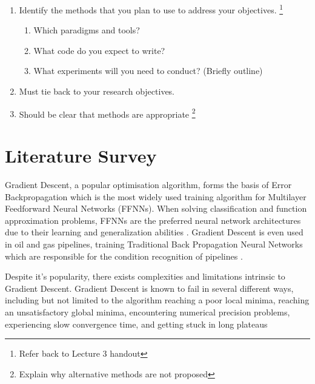\documentclass[runningheads,a4paper]{llncs}
\begin{document}
\begin{enumerate}
 \item Identify the methods that you plan to use to address your objectives. \footnote{Refer back to Lecture 3 handout}
 \begin{enumerate}
  \item Which paradigms and tools?
  \item What code do you expect to write?
  \item What experiments will you need to conduct? (Briefly outline)
 \end{enumerate}
 \item Must tie back to your research objectives.
 \item Should be clear that methods are appropriate \footnote{Explain why alternative methods are not proposed}

\end{enumerate}


\section{Literature Survey}

Gradient Descent, a popular optimisation algorithm, forms the basis of Error Backpropagation which is 
the most widely used training algorithm for Multilayer Feedforward Neural Networks (FFNNs). 
When solving classification and function approximation problems, FFNNs are the preferred neural network architectures 
due to their learning and generalization abilities \cite{gong2012training}. Gradient Descent is even used in oil and gas pipelines, 
training Traditional Back Propagation Neural Networks which are responsible for the condition recognition of pipelines \cite{laibin2009novel}.

Despite it's popularity, there exists complexities and limitations intrinsic to Gradient Descent. Gradient Descent is known to fail in
several different ways, including but not limited to the algorithm reaching a poor local minima, reaching an unsatisfactory global minima,
encountering numerical precision problems, experiencing slow convergence time, and getting stuck in long plateaus \cite{baldi1995gradient,cetin1993global,laibin2009novel,soni2013performance}
\end{document}

